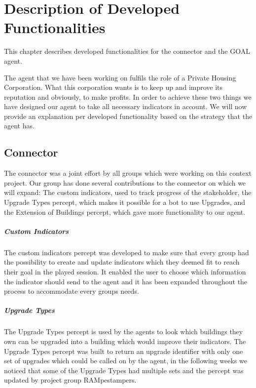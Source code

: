 \chapter[Description of Developed Functionalities]{Description of Developed \\ Functionalities}
This chapter describes developed functionalities for the connector and the GOAL agent.

The agent that we have been working on fulfils the role of a Private Housing Corporation. What this corporation wants is to keep up and improve its reputation and obviously, to make profits. In order to achieve these two things we have designed our agent to take all necessary indicators in account. We will now provide an explanation per developed functionality based on the strategy that the agent has.

\section{Connector} 
The connector was a joint effort by all groups which were working on this context project. Our group has done several contributions to the connector on which we will expand: The custom indicators, used to track progress of the stakeholder, the Upgrade Types percept, which makes it possible for a bot to use Upgrades, and the Extension of Buildings percept, which gave more functionality to our agent.

\paragraph{Custom Indicators}
The custom indicators percept was developed to make sure that every group had the possibility to create and update indicators which they deemed fit to reach their goal in the played session. It enabled the user to choose which information the indicator should send to the agent and it has been expanded throughout the process to accommodate every groups needs.

\paragraph{Upgrade Types}
The Upgrade Types percept is used by the agents to look which buildings they own can be upgraded into a building which would improve their indicators. The Upgrade Types percept was built to return an upgrade identifier with only one set of upgrades which could be called on by the agent, in the following weeks we noticed that some of the Upgrade Types had multiple sets and the percept was updated by project group RAMpestampers.

